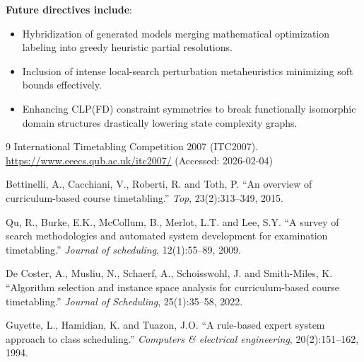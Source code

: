 \documentclass[11pt,letterpaper]{article}
\begin{document}
\textbf{Future directives include}:
\begin{itemize}[nosep]
  \item Hybridization of generated models merging mathematical optimization labeling into greedy heuristic partial resolutions.
  \item Inclusion of intense local-search perturbation metaheuristics minimizing soft bounds effectively.
  \item Enhancing CLP(FD) constraint symmetries to break functionally isomorphic domain structures drastically lowering state complexity graphs.
\end{itemize}

\begin{thebibliography}{9}
International Timetabling Competition 2007 (ITC2007).
\url{https://www.eeecs.qub.ac.uk/itc2007/} (Accessed: 2026-02-04)

Bettinelli, A., Cacchiani, V., Roberti, R. and Toth, P.
``An overview of curriculum-based course timetabling.''
\textit{Top}, 23(2):313--349, 2015.

Qu, R., Burke, E.K., McCollum, B., Merlot, L.T. and Lee, S.Y.
``A survey of search methodologies and automated system development for examination timetabling.''
\textit{Journal of scheduling}, 12(1):55--89, 2009.

De Coster, A., Musliu, N., Schaerf, A., Schoisswohl, J. and Smith-Miles, K.
``Algorithm selection and instance space analysis for curriculum-based course timetabling.''
\textit{Journal of Scheduling}, 25(1):35--58, 2022.

Guyette, L., Hamidian, K. and Tuazon, J.O.
``A rule-based expert system approach to class scheduling.''
\textit{Computers \& electrical engineering}, 20(2):151--162, 1994.
\end{thebibliography}
\end{document}
